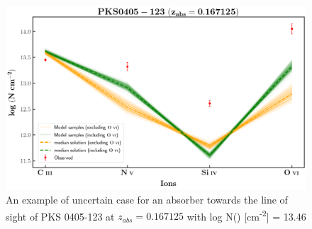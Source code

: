 \begin{figure}
    \centering
    \includegraphics[width=\linewidth]{Figures/pks0405-z=0.167125-compII.png}
    \caption{An example of uncertain case for an absorber towards the line of sight of PKS 0405-123 at $z_{abs}=0.167125$ with log N() [cm\textsuperscript{-2}] = 13.46}
    \label{fig:ex-uncertain}
\end{figure}




